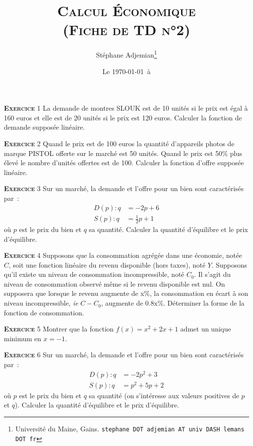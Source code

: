 \documentclass[10pt,a4paper,notitlepage]{article}
\newcommand{\exercice}[1]{\textsc{\textbf{Exercice}} #1}
\begin{document}
\title{\textsc{Calcul Économique\\ \small{(Fiche de TD n°2)}}}
\author{Stéphane Adjemian\thanks{Université du Maine, Gains. \texttt{stephane DOT adjemian AT univ DASH lemans DOT fr}}}
\date{Le \today\ à \thistime}

\maketitle

\exercice{1} La demande de montres SLOUK est de 10 unités si le prix est
égal à 160 euros et elle est de 20 unités si le prix est 120
euros. Calculer la fonction de demande supposée linéaire.

\bigskip

\exercice{2} Quand le prix est de 100 euros la quantité d'appareils
photos de marque PISTOL offerte sur le marché est 50 unités. Quand le
prix est 50\% plus élevé le nombre d'unités offertes est de
100. Calculer la fonction d'offre supposée linéaire.

\bigskip

\exercice{3} Sur un marché, la demande et l'offre pour un bien sont
caractérisés par :
\[
\begin{split}
  D(p): q &= -2 p  + 6\\
  S(p): q &= \frac{1}{2} p  + 1
\end{split}
\]
où $p$ est le prix du bien et $q$ sa quantité. Calculer la quantité
d'équilibre et le prix d'équilibre.

\bigskip

\exercice{4} Supposons que la consommation agrégée dans une économie,
notée $C$, soit une fonction linéaire du revenu disponible (hors
taxes), noté $Y$. Supposons qu'il existe un niveau de consommation
incompressible, noté $C_0$. Il s'agit du niveau de consommation
observé même si le revenu disponible est nul. On supposera que lorsque
le revenu augmente de x\%, la consommation en écart à son niveau
incompressible, \emph{ie} $C-C_0$, augmente de 0.8x\%. Déterminer la
forme de la fonction de consommation.

\bigskip

\exercice{5} Montrer que la fonction $f(x) = x^2+2x+1$ admet un unique
minimum en $x=-1$.

\bigskip

\exercice{6} Sur un marché, la demande et l'offre pour un bien sont
caractérisés par :
\[
\begin{split}
  D(p): q &= -2 p^2  + 3\\
  S(p): q &= p^2 + 5p +2
\end{split}
\]
où $p$ est le prix du bien et $q$ sa quantité (on s'intéresse aux
valeurs positives de $p$ et $q$). Calculer la quantité
d'équilibre et le prix d'équilibre.
\end{document}
